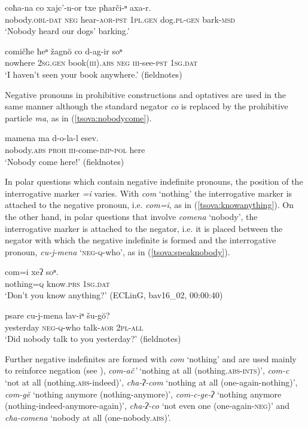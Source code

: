 \documentclass[output=paper,%
colorlinks,citecolor=brown,
showindex
]{langscibook}
\begin{document}
\ea	\label{tsova:dogbark3}
\gll 	coħa-na	co	xajc’-n-or	txe	pħarči-ⁿ	axa-r.\\  
	nobody.\textsc{obl-dat} \textsc{neg} hear-\textsc{aor-pst} \textsc{1pl.gen} dog.\textsc{pl-gen} bark-\textsc{msd}\\
\glt `Nobody heard our dogs’ barking.' \citep[202]{Mikeladze2011} 
\z

\ea	\label{tsova:booksaw}
\gll 	comičħe ħeⁿ žagnŏ co d-ag-ir soⁿ\\  
	nowhere \textsc{2sg.gen} book\textsc{(iii).abs} \textsc{neg} \textsc{iii}-see-\textsc{pst} \textsc{1sg.dat}\\
\glt `I haven't seen your book anywhere.' (fieldnotes)
\z

Negative pronouns in prohibitive constructions and optatives are used in the same manner although the standard negator \textit{co} is replaced by the prohibitive particle \textit{ma}, as in (\ref{tsova:nobodycome}).

\ea	\label{tsova:nobodycome}
\gll 	mamena	ma	d-o-la-l	esev.\\  
	nobody.\textsc{abs} \textsc{proh} \textsc{iii}-come-\textsc{imp-pol} here\\
\glt `Nobody come here!' (fieldnotes)
\z

In polar questions which contain negative indefinite pronouns, the position of the interrogative marker \textit{=i} varies. With \textit{com} `nothing' the interrogative marker is attached to the negative pronoun, i.e. \textit{com=i}, as in (\ref{tsova:knowanything}). On the other hand, in polar questions that involve \textit{comena}  `nobody', the interrogative marker is attached to the negator, i.e. it is placed between the negator with which the negative indefinite is formed and the interrogative pronoun, \textit{cu-j-mena} `\textsc{neg-q}-who', as in (\ref{tsova:speaknobody}).

\ea	\label{tsova:knowanything}
\gll 	com=i	xeʔ	soⁿ.\\  
	nothing\textsc{=q} know.\textsc{prs} \textsc{1sg.dat}\\
\glt `Don't you know anything?' (ECLinG, bav16\_02, 00:00:40)
\z

\ea	\label{tsova:speaknobody}
\gll 	psare cu-j-mena lav-iⁿ šu-gŏ?\\  
	yesterday \textsc{neg}-\textsc{q}-who talk-\textsc{aor} \textsc{2pl-all}\\
\glt `Did nobody talk to you yesterday?' (fieldnotes)
\z

Further negative indefinites are formed  with \textit{com} `nothing'  and are used mainly to reinforce negation (see ), \textit{com-ač'} `nothing at all (nothing.\textsc{abs-ints})', \textit{com-c} `not at all (nothing.\textsc{abs}-indeed)', \textit{cħa-ʔ-com} `nothing at all (one-again-nothing)', \textit{com-gĕ} `nothing anymore (nothing-anymore)', \textit{com-c-ge-ʔ} `nothing anymore (nothing-{indeed}-anymore-again)', \textit{cħa-ʔ-co} `not even one (one-again-\textsc{neg})' and \textit{cħa-comena} `nobody at all (one-nobody.\textsc{abs})'. 
\end{document}
